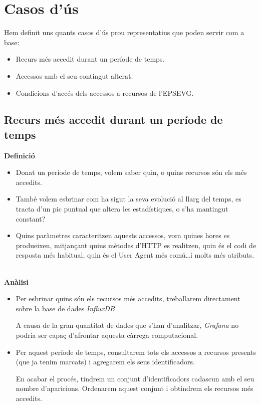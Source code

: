 \section{Casos d'ús}\label{sec:analysis-visualization-use-cases}

Hem definit uns quants casos d’ús prou representatius que poden servir com a base:

\begin{itemize}
    \item Recurs més accedit durant un període de temps.
    \item Accessos amb el seu contingut alterat.
    \item Condicions d'accés dels accessos a recursos de l'EPSEVG.
\end{itemize}

\subsection{Recurs més accedit durant un període de temps}\label{subsec:most-accessed-resource}

\textbf{Definició}

\begin{itemize}
    \item Donat un període de temps, volem saber quin, o quins recursos són els més accedits.
    \item També volem esbrinar com ha sigut la seva evolució al llarg del temps, es tracta d’un pic puntual que altera les estadístiques, o s’ha mantingut constant?
    \item Quins paràmetres caracteritzen aquests accessos, vora quines hores es produeixen, mitjançant quins mètodes d’HTTP es realitzen, quin és el codi de resposta més habitual, quin és el User Agent més comú\dots i molts més atributs.
\end{itemize}

\noindent \\
\textbf{Anàlisi}

\begin{itemize}
    \item Per esbrinar quins són els recursos més accedits, treballarem directament sobre la base de dades \textit{InfluxDB} .

    A causa de la gran quantitat de dades que s’han d’analitzar, \textit{Grafana} no podria ser capaç d’afrontar aquesta càrrega computacional.

    \item Per aquest període de temps, consultarem tots els accessos a recursos presents (que ja tenim marcats) i agregarem els seus identificadors.

    En acabar el procés, tindrem un conjunt d’identificadors cadascun amb el seu nombre d’aparicions.
    Ordenarem aquest conjunt i obtindrem els recursos més accedits.
\end{itemize}

